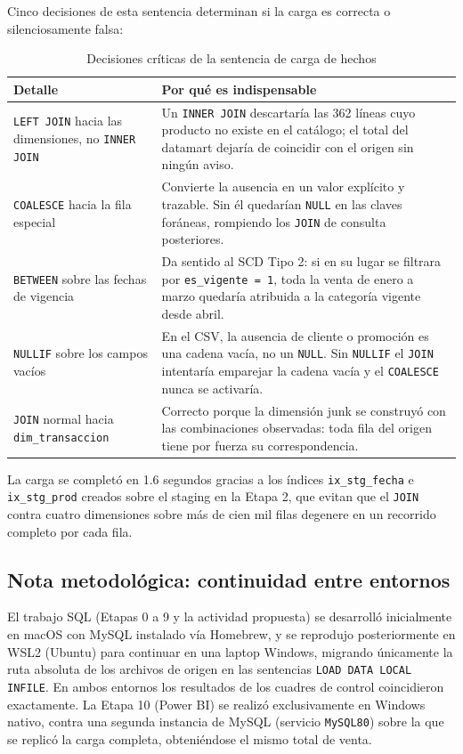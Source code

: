 \documentclass[11pt,a4paper]{article}
\begin{document}
Cinco decisiones de esta sentencia determinan si la carga es correcta o silenciosamente falsa:

\begin{table}[h!]
\centering
\caption{Decisiones críticas de la sentencia de carga de hechos}
\label{tab:detalles-carga}
\begin{tabular}{p{4.2cm}p{9.5cm}}
\toprule
\textbf{Detalle} & \textbf{Por qué es indispensable} \\
\midrule
\texttt{LEFT JOIN} hacia las dimensiones, no \texttt{INNER JOIN} & Un \texttt{INNER JOIN} descartaría las 362 líneas cuyo producto no existe en el catálogo; el total del datamart dejaría de coincidir con el origen sin ningún aviso. \\
\texttt{COALESCE} hacia la fila especial & Convierte la ausencia en un valor explícito y trazable. Sin él quedarían \texttt{NULL} en las claves foráneas, rompiendo los \texttt{JOIN} de consulta posteriores. \\
\texttt{BETWEEN} sobre las fechas de vigencia & Da sentido al SCD Tipo 2: si en su lugar se filtrara por \texttt{es\_vigente = 1}, toda la venta de enero a marzo quedaría atribuida a la categoría vigente desde abril. \\
\texttt{NULLIF} sobre los campos vacíos & En el CSV, la ausencia de cliente o promoción es una cadena vacía, no un \texttt{NULL}. Sin \texttt{NULLIF} el \texttt{JOIN} intentaría emparejar la cadena vacía y el \texttt{COALESCE} nunca se activaría. \\
\texttt{JOIN} normal hacia \texttt{dim\_transaccion} & Correcto porque la dimensión junk se construyó con las combinaciones observadas: toda fila del origen tiene por fuerza su correspondencia. \\
\bottomrule
\end{tabular}
\end{table}

La carga se completó en 1.6 segundos gracias a los índices \texttt{ix\_stg\_fecha} e \texttt{ix\_stg\_prod} creados sobre el staging en la Etapa 2, que evitan que el \texttt{JOIN} contra cuatro dimensiones sobre más de cien mil filas degenere en un recorrido completo por cada fila.

\subsection{Nota metodológica: continuidad entre entornos}
\label{sec:continuidad}

El trabajo SQL (Etapas 0 a 9 y la actividad propuesta) se desarrolló inicialmente en macOS con MySQL instalado vía Homebrew, y se reprodujo posteriormente en WSL2 (Ubuntu) para continuar en una laptop Windows, migrando únicamente la ruta absoluta de los archivos de origen en las sentencias \texttt{LOAD DATA LOCAL INFILE}. En ambos entornos los resultados de los cuadres de control coincidieron exactamente. La Etapa 10 (Power BI) se realizó exclusivamente en Windows nativo, contra una segunda instancia de MySQL (servicio \texttt{MySQL80}) sobre la que se replicó la carga completa, obteniéndose el mismo total de venta.
\end{document}
